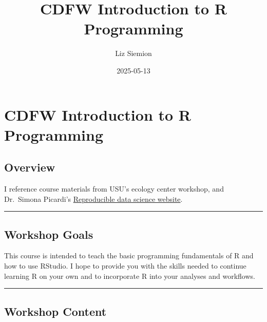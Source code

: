 \documentclass[
]{book}
\title{CDFW Introduction to R Programming}
\author{Liz Siemion}
\date{2025-05-13}
\begin{document}
\maketitle

{
\setcounter{tocdepth}{1}
\tableofcontents
}
\chapter{CDFW Introduction to R Programming}\label{overview}

\section{Overview}\label{overview-1}

I reference course materials from USU's ecology center workshop, and Dr.~Simona Picardi's \href{https://ecorepsci.github.io/reproducible-science/index.html}{Reproducible data science website}.

\begin{center}\rule{0.5\linewidth}{0.5pt}\end{center}

\section{Workshop Goals}\label{workshop-goals}

This course is intended to teach the basic programming fundamentals of R and
how to use RStudio. I hope to provide you with the skills needed to continue
learning R on your own and to incorporate R into your analyses and workflows.

\begin{center}\rule{0.5\linewidth}{0.5pt}\end{center}

\section{Workshop Content}\label{workshop-content}
\end{document}
